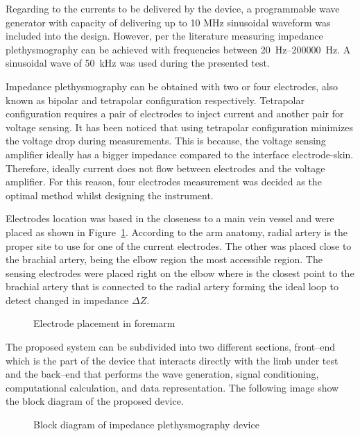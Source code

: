 Regarding to the currents to be delivered by the device, a programmable wave generator with capacity of delivering up to 10 MHz sinusoidal waveform was included into the design. However, per the literature measuring impedance plethysmography can be achieved with frequencies between \SIrange{20}{200000}{\hertz}. A sinusoidal wave of \SI{50}{\kilo\hertz} was used during the presented test. 

Impedance plethysmography can be obtained with two or four electrodes, also known as bipolar and tetrapolar configuration respectively. Tetrapolar configuration requires a pair of electrodes to inject current and another pair for voltage sensing. It has been noticed that using tetrapolar configuration minimizes the voltage drop during measurements. This is because, the voltage sensing amplifier ideally has a bigger impedance compared to the interface electrode-skin. Therefore, ideally current does not flow between electrodes and the voltage amplifier. For this reason, four electrodes measurement was decided as the optimal method whilst designing the instrument. 

Electrodes location was based in the closeness to a main vein vessel and were placed as shown in Figure~\ref{fig:electrode}. According to the arm anatomy, radial artery is the proper site to use for one of the current electrodes. The other was placed close to the brachial artery, being the elbow region the most accessible region. The sensing electrodes were placed right on the elbow where is the closest point to the brachial artery that is connected to the radial artery forming the ideal loop to detect changed in impedance $\Delta Z$. 

\begin{figure}
	\label{fig:electrode}
	\caption{Electrode placement in foremarm}
\end{figure}

The proposed system can be subdivided into two different sections, front–end which is the part of the device that interacts directly with the limb under test and the back–end that performs the wave generation, signal conditioning, computational calculation, and data representation. The following image show the block diagram of the proposed device.

\begin{figure}
	\label{fig:block}
	\caption{Block diagram of impedance plethysmography device}
\end{figure}

